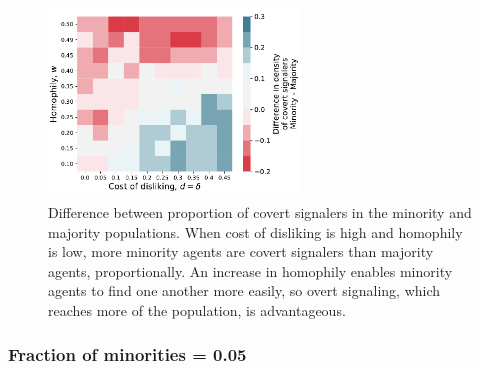 \documentclass[11pt,letterpaper]{article}
\begin{document}
\begin{figure}[H]
  \centering
    \includegraphics[width=0.6\textwidth]{prelim/Figures/covert_signalers_diff_025.pdf}
  \caption{Difference between proportion of covert signalers in the minority 
    and majority populations. When cost of disliking is high and homophily is 
    low, more minority agents are covert signalers than majority agents,
    proportionally. An increase in homophily enables minority agents to 
    find one another more easily, so overt signaling, which reaches more of
    the population, is advantageous.
  }
  \label{fig:}
\end{figure}

\subsubsection{Fraction of minorities = 0.05}
\end{document}
